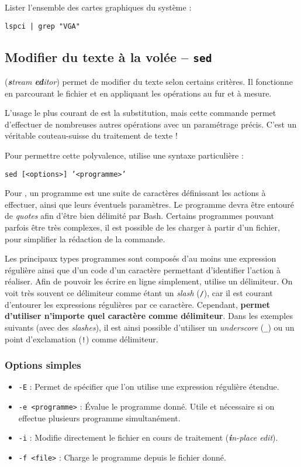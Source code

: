 Lister l'ensemble des cartes graphiques du système :
\begin{nscenter}
\texttt{lspci | grep "VGA"}
\end{nscenter}

\newpage
\subsection{Modifier du texte à la volée -- \texttt{sed}} 
 (\textit{\textbf{s}tream \textbf{ed}itor}) permet de modifier du texte selon certains critères. Il fonctionne en parcourant le fichier et en appliquant les opérations au fur et à mesure.

L'usage le plus courant de  est la substitution, mais cette commande permet d'effectuer de nombreuses autres opérations avec un paramétrage précis. C'est un véritable couteau-suisse du traitement de texte !

Pour permettre cette polyvalence,  utilise une syntaxe particulière : 
\begin{nscenter}
\texttt{sed [<options>] '<programme>'}
\end{nscenter}
Pour , un programme est une suite de caractères définissant les actions à effectuer, ainsi que leurs éventuels paramètres. Le programme devra être entouré de \textit{quotes} afin d'être bien délimité par Bash. Certains programmes pouvant parfois être très complexes, il est possible de les charger à partir d'un fichier, pour simplifier la rédaction de la commande.

Les principaux types programmes  sont composés d'au moins une expression régulière ainsi que d'un code d'un caractère permettant d'identifier l'action à réaliser. Afin de pouvoir les écrire en ligne simplement,  utilise un délimiteur. On voit très souvent ce délimiteur comme étant un \textit{slash} (\texttt{/}), car il est courant d'entourer les expressions régulières par ce caractère. Cependant, \textbf{ permet d'utiliser n'importe quel caractère comme délimiteur}. Dans les exemples suivants (avec des \textit{slashes}), il est ainsi possible d'utiliser un \textit{underscore} (\texttt{\_}) ou un point d'exclamation (\texttt{!}) comme délimiteur.

\subsubsection{Options simples}
\begin{itemize}
    \item \texttt{-E} : Permet de spécifier que l'on utilise une expression régulière étendue.
    \item \texttt{-e <programme>} : Évalue le programme donné. Utile et nécessaire si on effectue plusieurs programme simultanément.
    \item \texttt{-i} : Modifie directement le fichier en cours de traitement (\textit{\textbf{i}n-place edit}).
    \item \texttt{-f <file>} : Charge le programme  depuis le fichier donné.
\end{itemize}

